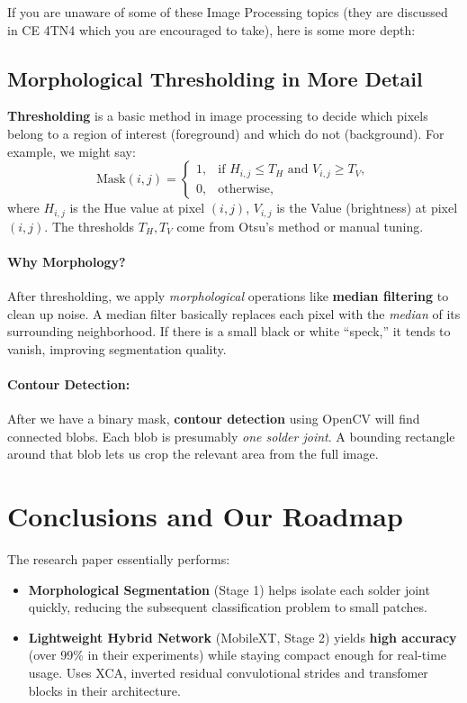 \documentclass{article}
\begin{document}
If you are unaware of some of these Image Processing topics (they are discussed in CE 4TN4 which you are encouraged to take), here is some more depth:
\subsection{Morphological Thresholding in More Detail }
\label{sec:morphological-detail}

\textbf{Thresholding} is a basic method in image processing to decide which pixels belong to a region of interest (foreground) and which do not (background). 
For example, we might say:
\[
   \text{Mask}(i,j) = 
   \begin{cases}
       1, & \text{if } H_{i,j} \leq T_H \text{ and } V_{i,j} \geq T_V, \\
       0, & \text{otherwise},
   \end{cases}
\]
where $H_{i,j}$ is the Hue value at pixel $(i,j)$, $V_{i,j}$ is the Value (brightness) at pixel $(i,j)$. 
The thresholds $T_H, T_V$ come from Otsu’s method or manual tuning.

\paragraph{Why Morphology?}
After thresholding, we apply \emph{morphological} operations like \textbf{median filtering} to clean up noise. 
A median filter basically replaces each pixel with the \emph{median} of its surrounding neighborhood. 
If there is a small black or white ``speck,'' it tends to vanish, improving segmentation quality.

\paragraph{Contour Detection:}
After we have a binary mask, \textbf{contour detection} using OpenCV will find connected blobs. 
Each blob is presumably \emph{one solder joint}. 
A bounding rectangle around that blob lets us crop the relevant area from the full image.

\section{Conclusions and Our Roadmap}
The research paper essentially performs:
\begin{itemize}
    \item \textbf{Morphological Segmentation} (Stage 1) helps isolate each solder joint quickly, 
          reducing the subsequent classification problem to small patches.
    \item \textbf{Lightweight Hybrid Network} (MobileXT, Stage 2) yields \textbf{high accuracy} (over 99\% in their experiments) 
          while staying compact enough for real-time usage. Uses XCA, inverted residual convulotional strides and transfomer blocks in their architecture.
\end{itemize}
\end{document}
